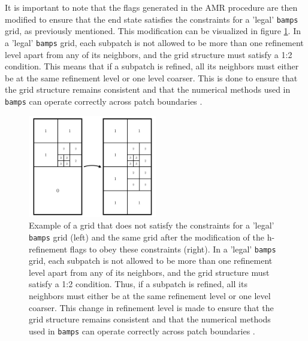 It is important to note that the flags generated in the AMR procedure are then modified to ensure that the end state satisfies the constraints for a 'legal' \texttt{bamps} grid, as previously mentioned. This modification can be visualized in figure \ref{fig:amr_legal}. In a 'legal' \texttt{bamps} grid, each subpatch is not allowed to be more than one refinement level apart from any of its neighbors, and the grid structure must satisfy a 1:2 condition. This means that if a subpatch is refined, all its neighbors must either be at the same refinement level or one level coarser. This is done to ensure that the grid structure remains consistent and that the numerical methods used in \texttt{bamps} can operate correctly across patch boundaries \cite{Adaptive_hp_refinement_for_spectral_elements_in_numerical_relativity}.

\begin{figure}[t!]
    \centering
    \includegraphics[width=0.5\textwidth]{Figures/AMR.png}
    \caption{Example of a grid that does not satisfy the constraints for a 'legal' \texttt{bamps} grid (left) and the same grid after the modification of the h-refinement flags to obey these constraints (right). In a 'legal' \texttt{bamps} grid, each subpatch is not allowed to be more than one refinement level apart from any of its neighbors, and the grid structure must satisfy a 1:2 condition. Thus, if a subpatch is refined, all its neighbors must either be at the same refinement level or one level coarser. This change in refinement level is made to ensure that the grid structure remains consistent and that the numerical methods used in \texttt{bamps} can operate correctly across patch boundaries \cite{Adaptive_hp_refinement_for_spectral_elements_in_numerical_relativity}.}
    \label{fig:amr_legal}
\end{figure}